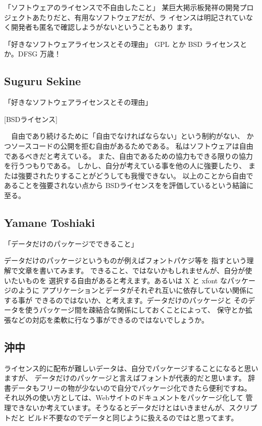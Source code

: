 \documentclass[mingoth,a4paper]{jsarticle}
\begin{document}
\begin{multicols}{2}
{「ソフトウェアのライセンスで不自由したこと」
某巨大掲示板発祥の開発プロジェクトあたりだと、有用なソフトウェアだが、ラ
イセンスは明記されていなく開発者も匿名で確認しようがないということもあり
ます。

「好きなソフトウェアライセンスとその理由」
GPL とか BSD ライセンスとか。DFSG 万歳！



\subsection{Suguru Sekine}
「好きなソフトウェアライセンスとその理由」

[BSDライセンス]

　自由であり続けるために「自由でなければならない」という制約がない、
かつソースコードの公開を拒む自由があるためである。
私はソフトウェアは自由であるべきだと考えている。
また、自由であるための協力もできる限りの協力を行うつもりである。
しかし、自分が考えている事を他の人に強要したり、
または強要されたりすることがどうしても我慢できない。
以上のことから自由であることを強要されない点から
BSDライセンスをを評価しているという結論に至る。

\subsection{Yamane Toshiaki}

「データだけのパッケージでできること」

データだけのパッケージというものが例えばフォントパケジ等を
指すという理解で文章を書いてみます。
できること、ではないかもしれませんが、自分が使いたいものを
選択する自由があると考えます。あるいは X と xfont なパッケージのように
アプリケーションとデータがそれぞれ互いに依存していない関係にする事が
できるのではないか、と考えます。データだけのパッケージと
そのデータを使うパッケージ間を疎結合な関係にしておくことによって、
保守とか拡張などの対応を柔軟に行なう事ができるのではないでしょうか。

\subsection{沖中}

ライセンス的に配布が難しいデータは、自分でパッケージすることになると思いますが、
データだけのパッケージと言えばフォントが代表的だと思います。
辞書データもフリーの物が少ないので自分でパッケージ化できたら便利ですね。
それ以外の使い方としては、Webサイトのドキュメントをパッケージ化して
管理できないか考えています。そうなるとデータだけとはいきませんが、スクリプトだと
ビルド不要なのでデータと同じように扱えるのではと思ってます。


}
\end{multicols}
\end{document}
